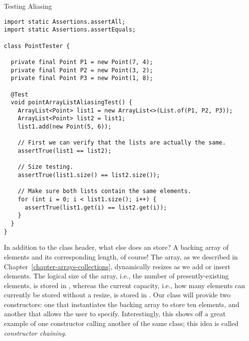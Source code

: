 \begin{cl}{Testing  Aliasing}
\begin{lstlisting}[language=MyJava]
import static Assertions.assertAll;
import static Assertions.assertEquals;

class PointTester {

  private final Point P1 = new Point(7, 4);
  private final Point P2 = new Point(3, 2);
  private final Point P3 = new Point(1, 8);

  @Test
  void pointArrayListAliasingTest() {
    ArrayList<Point> list1 = new ArrayList<>(List.of(P1, P2, P3));
    ArrayList<Point> list2 = list1;
    list1.add(new Point(5, 6));

    // First we can verify that the lists are actually the same.
    assertTrue(list1 == list2);

    // Size testing.
    assertTrue(list1.size() == list2.size());

    // Make sure both lists contain the same elements.
    for (int i = 0; i < list1.size(); i++) {
      assertTrue(list1.get(i) == list2.get(i));
    }
  }
}
\end{lstlisting}
\end{cl}


In addition to the class header, what else does an  store? A backing array of elements and its corresponding length, of course! The array, as we described in Chapter~\ref{chapter-arrays-collections}, dynamically resizes as we add or insert elements. The logical size of the array, i.e., the number of presently-existing elements, is stored in , whereas the current capacity, i.e., how many elements can currently be stored without a resize, is stored in . Our class will provide two constructors: one that instantiates the backing array to store ten elements, and another that allows the user to specify. Interestingly, this shows off a great example of one constructor calling another of the same class; this idea is called \textit{constructor chaining}. 

